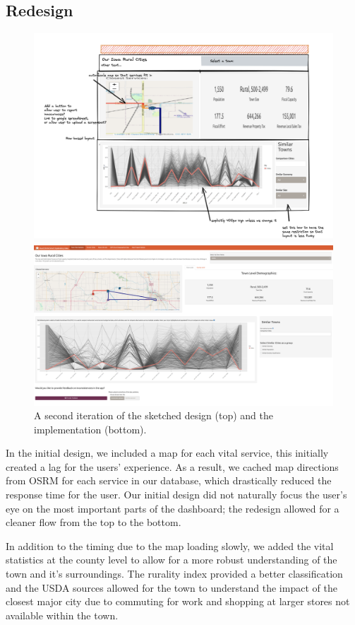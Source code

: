 \documentclass[print]{nuthesis}
\begin{document}
\hypertarget{redesign}{%
\subsection{Redesign}\label{redesign}}

\begin{figure}
\includegraphics[width=.8\textwidth]{figure/Version3}

\includegraphics[width=\textwidth]{figure/Version4}
\caption{A second iteration of the sketched design (top) and the implementation (bottom).}\label{fig:v2}
\end{figure}

In the initial design, we included a map for each vital service, this initially created a lag for the users' experience. As a result, we cached map directions from OSRM for each service in our database, which drastically reduced the response time for the user. Our initial design did not naturally focus the user's eye on the most important parts of the dashboard; the redesign allowed for a cleaner flow from the top to the bottom.

In addition to the timing due to the map loading slowly, we added the vital statistics at the county level to allow for a more robust understanding of the town and it's surroundings. The rurality index provided a better classification and the USDA sources allowed for the town to understand the impact of the closest major city due to commuting for work and shopping at larger stores not available within the town.
\end{document}
